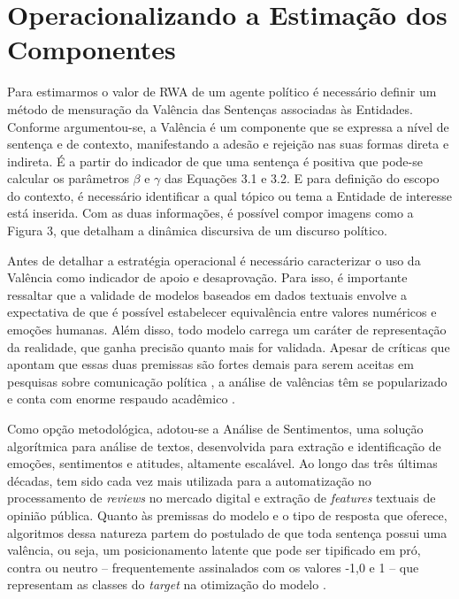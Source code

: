 \documentclass[
12pt,				%
openright,			%
twoside,			%
a4paper,			%
english,			%
french,				%
spanish,			%
brazil				%
]{abntex2}
\begin{document}
\section{Operacionalizando a Estimação dos Componentes}

Para estimarmos o valor de RWA de um agente político é necessário definir um método de mensuração da Valência das Sentenças associadas às Entidades. Conforme argumentou-se, a Valência é um componente que se expressa a nível de sentença e de contexto, manifestando a adesão e rejeição nas suas formas direta e indireta. É a partir do indicador de que uma sentença é positiva que pode-se calcular os parâmetros $\beta$ e $\gamma$ das Equações 3.1 e 3.2. E para definição do escopo do contexto, é necessário identificar a qual tópico ou tema a Entidade de interesse está inserida. Com as duas informações, é possível compor imagens como a Figura 3, que detalham a dinâmica discursiva de um discurso político.

Antes de detalhar a estratégia operacional é necessário caracterizar o uso da Valência como indicador de apoio e desaprovação. Para isso, é importante ressaltar que a validade de modelos baseados em dados textuais envolve a expectativa de que é possível estabelecer equivalência entre valores numéricos e emoções humanas. Além disso, todo modelo carrega um caráter de representação da realidade, que ganha precisão quanto mais for validada. Apesar de críticas que apontam que essas duas premissas são fortes demais para serem aceitas em pesquisas sobre comunicação política \cite{miguel2015vale}, a análise de valências têm se popularizado e conta com enorme respaudo acadêmico \cite{feres2016analise}.      

Como opção metodológica, adotou-se a Análise de Sentimentos, uma solução algorítmica para análise de textos, desenvolvida para extração e identificação de emoções, sentimentos e atitudes, altamente escalável. Ao longo das três últimas décadas, tem sido cada vez mais utilizada para a automatização no processamento de \emph{reviews} no mercado digital e extração de \emph{features} textuais de opinião pública. Quanto às premissas do modelo e o tipo de resposta que oferece, algoritmos dessa natureza partem do postulado de que toda sentença possui uma valência, ou seja, um posicionamento latente que pode ser tipificado em pró, contra ou neutro -- frequentemente assinalados com os valores -1,0 e 1 -- que representam as classes do \emph{target} na otimização do modelo \cite{serrano2015sentiment, mantyla2018evolution}.  
\end{document}
